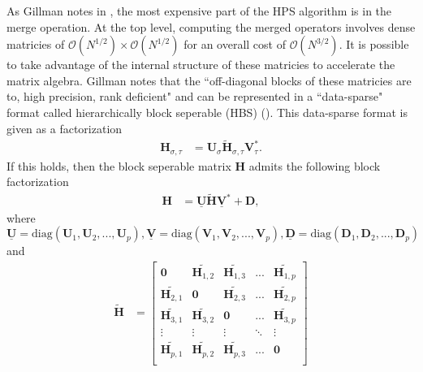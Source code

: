 As Gillman notes in \citep{gillman2014direct}, the most expensive part of the HPS algorithm is in the merge operation. At the top level, computing the merged operators involves dense matricies of $\mathcal{O}(N^{1/2}) \times \mathcal{O}(N^{1/2})$ for an overall cost of $\mathcal{O}(N^{3/2})$. It is possible to take advantage of the internal structure of these matricies to accelerate the matrix algebra. Gillman notes that the ``off-diagonal blocks of these matricies are to, high precision, rank deficient" and can be represented in a ``data-sparse" format called hierarchically block seperable (HBS) (\citep{gillman2014direct}). This data-sparse format is given as a factorization
\begin{align}
    \textbf{H}_{\sigma, \tau} &= \textbf{U}_{\sigma} \tilde{\textbf{H}}_{\sigma, \tau} \textbf{V}_{\tau}^*.
\end{align}
If this holds, then the block seperable matrix $\textbf{H}$ admits the following block factorization
\begin{align}
    \textbf{H} &= \underline{\textbf{U}} \tilde{\textbf{H}} \underline{\textbf{V}}^* + \textbf{D},
\end{align}
where $\underline{\textbf{U}} = \text{diag}(\textbf{U}_1, \textbf{U}_2, ..., \textbf{U}_p), \underline{\textbf{V}} = \text{diag}(\textbf{V}_1, \textbf{V}_2, ..., \textbf{V}_p), \underline{\textbf{D}} = \text{diag}(\textbf{D}_1, \textbf{D}_2, ..., \textbf{D}_p)$
and
\begin{align}
    \tilde{\textbf{H}} &=
    \begin{bmatrix}
        \textbf{0}       & \tilde{\textbf{H}_{1,2}} & \tilde{\textbf{H}_{1,3}} & ...    & \tilde{\textbf{H}_{1,p}} \\
        \tilde{\textbf{H}_{2,1}} & \textbf{0}       & \tilde{\textbf{H}_{2,3}} & ...    & \tilde{\textbf{H}_{2,p}} \\
        \tilde{\textbf{H}_{3,1}} & \tilde{\textbf{H}_{3,2}} & \textbf{0}       & ...    & \tilde{\textbf{H}_{3,p}} \\
        \vdots           & \vdots           & \vdots           & \ddots & \vdots           \\
        \tilde{\textbf{H}_{p,1}} & \tilde{\textbf{H}_{p,2}} & \tilde{\textbf{H}_{p,3}} & ...    & \textbf{0}       \\
    \end{bmatrix}
\end{align}

